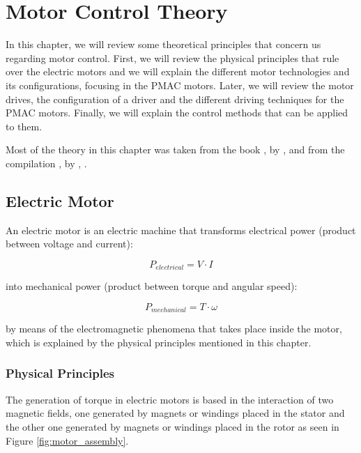 \chapter{Motor Control Theory} \label{chap:theory}

In this chapter, we will review some theoretical principles that concern us regarding motor control. First, we will review the physical principles that rule over the electric motors and we will explain the different motor technologies and its configurations, focusing in the \acf{PMAC} motors. Later, we will review the motor drives, the configuration of a driver and the different driving techniques for the \ac{PMAC} motors. Finally, we will explain the control methods that can be applied to them.

Most of the theory in this chapter was taken from the book , by \citeauthor{sistemi_di_controllo:2007}, \citeyear{sistemi_di_controllo:2007} and from the compilation , by \citeauthor{AC_drives}, \citeyear{AC_drives}.


\section{Electric Motor}

An electric motor is an electric machine that transforms electrical power (product between voltage and current):

\begin{equation}
	\label{eq:e_elec}
	P_{electrical} = V \cdot I
\end{equation}

into mechanical power (product between torque and angular speed):

\begin{equation}
	\label{eq:e_mech}
	P_{mechanical} = T \cdot \omega
\end{equation}

by means of the electromagnetic phenomena that takes place inside the motor, which is explained by the physical principles mentioned in this chapter.

\subsection{Physical Principles} \label{physical_principles}

The generation of torque in electric motors is based in the interaction of two magnetic fields, one generated by magnets or windings placed in the stator and the other one generated by magnets or windings placed in the rotor as seen in Figure \ref{fig:motor_assembly}.

